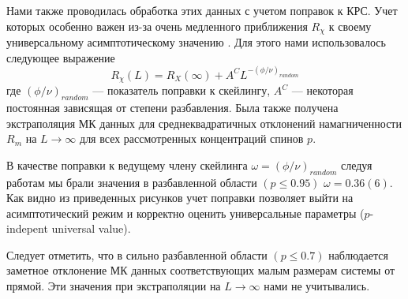 Нами также проводилась обработка этих данных с учетом поправок к КРС. Учет которых особенно важен из-за очень медленного приближения $R_\chi$ к своему универсальному асимптотическому значению \cite{ph2_3}. Для этого нами использовалось следующее выражение
\begin{equation}
  R_\chi(L) = R_X(\infty)+A^C L^{-(\phi/\nu)_{random}}
\end{equation}
где $(\phi/\nu)_{random}$ --- показатель поправки к скейлингу, $A^C$ --- некоторая постоянная зависящая от степени разбавления.
Была также получена экстраполяция МК данных для среднеквадратичных отклонений намагниченности $R_m$ на $L \rightarrow \infty$  для всех рассмотренных концентраций спинов $p$.

В качестве поправки к ведущему члену скейлинга $\omega = (\phi/\nu)_{random}$  следуя работам \cite{ph2_8, ph2_9} мы брали значения в разбавленной области $(p\le0.95)$ $\omega=0.36(6)$.
Как видно из приведенных рисунков учет поправки позволяет выйти на асимптотический режим и корректно оценить универсальные параметры ($p$-indepent universal value).

Следует отметить, что в сильно разбавленной области $(p\le0.7)$ наблюдается заметное отклонение МК данных соответствующих малым размерам системы от прямой. Эти значения при экстраполяции на $L \rightarrow \infty$    нами не учитывались.






%
%


